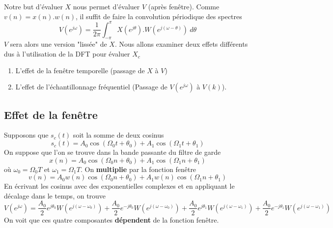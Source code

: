 	Notre but d'évaluer $X$ nous permet d'évaluer $V$ (après fenêtre). Comme $v(n)=x(n).w(n)$, il suffit 
	de faire la convolution périodique des spectres
	\begin{equation}
	V(e^{j\omega}) = \dfrac{1}{2\pi}\int_{-\pi}^\pi X(e^{j\theta}).W(e^{j(\omega-\theta)})\ d\theta
	\end{equation}
	$V$ sera alors une version "lissée" de $X$. Nous allons examiner deux effets différents dus à 
	l'utilisation de la DFT pour évaluer $X_c$
	\begin{enumerate}
	\item L'effet de la fenêtre temporelle (passage de $X$ à $V$)
	\item L'effet de l’échantillonnage fréquentiel (Passage de $V(e^{j\omega})$ à $V(k)$).
	\end{enumerate}
		
		\subsection{Effet de la fenêtre}
		Supposons que $s_c(t)$ soit la somme de deux cosinus
		\begin{equation}
		s_c(t) = A_0\cos(\Omega_0t+\theta_0)+A_1\cos(\Omega_1t+\theta_1)
		\end{equation}
		On suppose que l'on se trouve dans la bande passante du filtre de garde
		\begin{equation}
		x(n) = A_0\cos(\Omega_0n+\theta_0)+A_1\cos(\Omega_1n+\theta_1)
		\end{equation}		
		où $\omega_0=\Omega_0T$ et $\omega_1 = \Omega_1T$. On \textbf{multiplie} par la fonction 
		fenêtre
		\begin{equation}
		v(n) = A_0w(n)\cos(\Omega_0n+\theta_0)+A_1w(n)\cos(\Omega_1n+\theta_1)
		\end{equation}
		En écrivant les cosinus avec des exponentielles complexes et en appliquant le décalage 
		dans le temps, on trouve
		\begin{equation}
		V(e^{j\omega}) = \frac{A_0}{2}e^{j\theta_0}W(e^{j(\omega-\omega_0)})+
		\frac{A_0}{2}e^{-j\theta_0}W(e^{j(\omega-\omega_0)})+
		\frac{A_0}{2}e^{j\theta_1}W(e^{j(\omega-\omega_1)})+
		\frac{A_0}{2}e^{-j\theta_1}W(e^{j(\omega-\omega_1)})
		\end{equation}
		On voit que ces quatre composantes \textbf{dépendent} de la fonction fenêtre.\\
		
